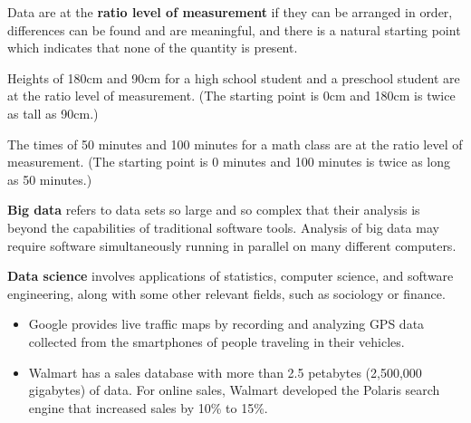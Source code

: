 \documentclass{beamer}
\begin{document}
\begin{frame}
\begin{definition}
Data are at the \textbf{ratio level of measurement} if they can be arranged in order, differences can be found and are meaningful, and there is a natural starting point which indicates that none of the quantity is present. 
\end{definition}\pause

\begin{example}
Heights of 180cm and 90cm for a high school student and a preschool student are at the ratio level of measurement. (The starting point is 0cm and 180cm is twice as tall as 90cm.)
\end{example}\pause

\begin{example}
The times of 50 minutes and 100 minutes for a math class are at the ratio level of measurement. (The starting point is 0 minutes and 100 minutes is twice as long as 50 minutes.)
\end{example}
\end{frame}

\begin{frame}
\begin{definition}
\textbf{Big data} refers to data sets so large and so complex that their analysis is beyond the capabilities of traditional software tools. Analysis of big data may require software simultaneously running in parallel on many different computers.
\end{definition}\pause

\begin{definition}
\textbf{Data science} involves applications of statistics, computer science, and software engineering, along with some other relevant fields, such as sociology or finance.
\end{definition}\pause

\begin{example}
\begin{itemize}
\item Google provides live traffic maps by recording and analyzing GPS data collected from the smartphones of people traveling in their vehicles.\pause
\item Walmart has a sales database with more than 2.5 petabytes (2,500,000 gigabytes) of data. For online sales, Walmart developed the Polaris search engine that increased sales by 10\% to 15\%.
\end{itemize}
\end{example}
\end{frame}
\end{document}
